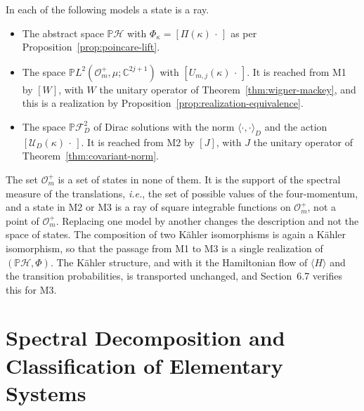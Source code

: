 \begin{remark}\label{rem:three-models}
	In each of the following models a state is a ray.
	\begin{itemize}
		\item[M1.] The abstract space $\mathbb{P}\mathcal{H}$ with $\Phi_\kappa=[\Pi(\kappa)\,\cdot\,]$ as per Proposition~\ref{prop:poincare-lift}.
		\item[M2.] The space $\mathbb{P}L^2(\mathcal{O}_m^+,\mu;\mathbb{C}^{2j+1})$ with $[U_{m,j}(\kappa)\,\cdot\,]$. It is reached from M1 by $[W]$, with $W$ the unitary operator of Theorem~\ref{thm:wigner-mackey}, and this is a realization by Proposition~\ref{prop:realization-equivalence}.
		\item[M3.] The space $\mathbb{P}\mathcal{F}_D^2$ of Dirac solutions with the norm $\langle\cdot,\cdot\rangle_D$ and the action $[\mathcal{U}_D(\kappa)\,\cdot\,]$. It is reached from M2 by $[J]$, with $J$ the unitary operator of Theorem~\ref{thm:covariant-norm}.
	\end{itemize}
	The set $\mathcal{O}_m^+$ is a set of states in none of them. It is the support of the spectral measure of the translations, \textit{i.e.}, the set of possible values of the four-momentum, and a state in M2 or M3 is a ray of square integrable functions on $\mathcal{O}_m^+$, not a point of $\mathcal{O}_m^+$. Replacing one model by another changes the description and not the space of states. The composition of two Kähler isomorphisms is again a Kähler isomorphism, so that the passage from M1 to M3 is a single realization of $(\mathbb{P}\mathcal{H},\Phi)$. The Kähler structure, and with it the Hamiltonian flow of $\langle H\rangle$ and the transition probabilities, is transported unchanged, and Section~6.7 verifies this for M3.
\end{remark}

\section{Spectral Decomposition and Classification of Elementary Systems}
\label{sec:poincare-spectral}
\label{sec:classification}

